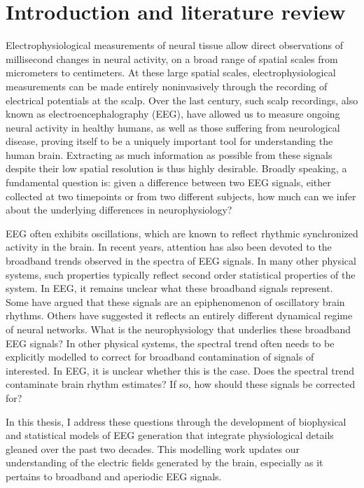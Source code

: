 \chapter{Introduction and literature review}

Electrophysiological measurements of neural tissue allow direct observations of millisecond changes in neural activity, on a broad range of spatial scales from micrometers to centimeters. At these large spatial scales, electrophysiological measurements can be made entirely noninvasively through the recording of electrical potentials at the scalp. Over the last century, such scalp recordings, also known as electroencephalography (EEG), have allowed us to measure ongoing neural activity in healthy humans, as well as those suffering from neurological disease, proving itself to be a uniquely important tool for understanding the human brain. Extracting as much information as possible from these signals despite their low spatial resolution is thus highly desirable. Broadly speaking, a fundamental question is: given a difference between two EEG signals, either collected at two timepoints or from two different subjects, how much can we infer about the underlying differences in neurophysiology? 

EEG often exhibits oscillations, which are known to reflect rhythmic synchronized activity in the brain. In recent years, attention has also been devoted to the broadband trends observed in the spectra of EEG signals. In many other physical systems, such properties typically reflect second order statistical properties of the system. In EEG, it remains unclear what these broadband signals represent. Some have argued that these signals are an epiphenomenon of oscillatory brain rhythms. Others have suggested it reflects an entirely different dynamical regime of neural networks. What is the neurophysiology that underlies these broadband EEG signals? In other physical systems, the spectral trend often needs to be explicitly modelled to correct for broadband contamination of signals of interested. In EEG, it is unclear whether this is the case. Does the spectral trend contaminate brain rhythm estimates? If so, how should these signals be corrected for?

In this thesis, I address these questions through the development of biophysical and statistical models of EEG generation that integrate physiological details gleaned over the past two decades. This modelling work updates our understanding of the electric fields generated by the brain, especially as it pertains to broadband and aperiodic EEG signals. 



